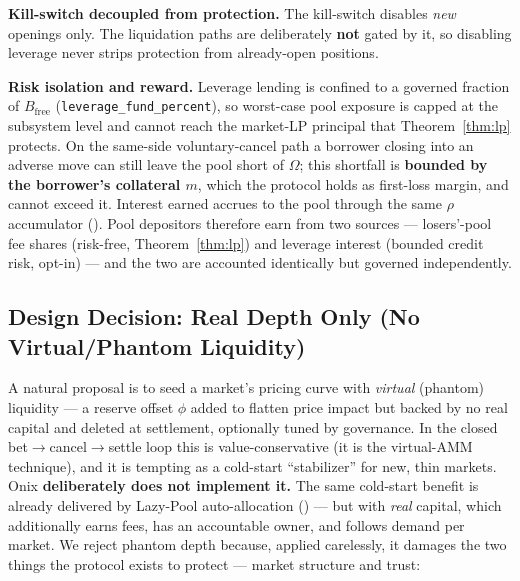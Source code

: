 \documentclass{ledger}
\theoremstyle{plain}
\theoremstyle{remark}
\begin{document}
\textbf{Kill-switch decoupled from protection.} The kill-switch disables
\emph{new} openings only. The liquidation paths are deliberately \textbf{not}
gated by it, so disabling leverage never strips protection from already-open
positions.

\textbf{Risk isolation and reward.} Leverage lending is confined to a governed
fraction of $B_{\text{free}}$ (\texttt{leverage\_fund\_percent}), so worst-case
pool exposure is capped at the subsystem level and cannot reach the market-LP
principal that Theorem~\ref{thm:lp} protects. On the same-side voluntary-cancel
path a borrower closing into an adverse move can still leave the pool short of
$\Omega$; this shortfall is \textbf{bounded by the borrower's collateral $m$},
which the protocol holds as first-loss margin, and cannot exceed it. Interest
earned accrues to the pool through the same $\rho$ accumulator
(). Pool depositors therefore earn from two sources ---
losers'-pool fee shares (risk-free, Theorem~\ref{thm:lp}) and leverage interest
(bounded credit risk, opt-in) --- and the two are accounted identically but
governed independently.

\subsection{Design Decision: Real Depth Only (No Virtual/Phantom Liquidity)}\label{sec:realdepth}

A natural proposal is to seed a market's pricing curve with \emph{virtual}
(phantom) liquidity --- a reserve offset $\phi$ added to flatten price impact but
backed by no real capital and deleted at settlement, optionally tuned by
governance. In the closed bet$\rightarrow$cancel$\rightarrow$settle loop this is
value-conservative (it is the virtual-AMM technique), and it is tempting as a
cold-start ``stabilizer'' for new, thin markets. Onix \textbf{deliberately does
not implement it.} The same cold-start benefit is already delivered by Lazy-Pool
auto-allocation () --- but with \emph{real} capital, which
additionally earns fees, has an accountable owner, and follows demand per
market. We reject phantom depth because, applied carelessly, it damages the two
things the protocol exists to protect --- market structure and trust:
\end{document}

